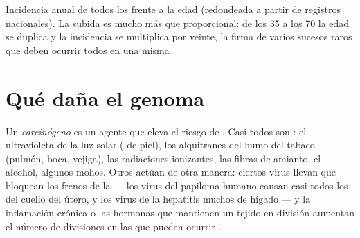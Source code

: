 \begin{omfigure}

{\small Incidencia anual de todos los  frente a la edad
(redondeada a partir de registros nacionales). La subida es mucho más
que proporcional: de los 35 a los 70 la edad se duplica y la incidencia
se multiplica por veinte, la firma de varios sucesos raros que deben
ocurrir todos en una misma .}
\end{omfigure}

\section{Qué daña el genoma}

\begin{definition}[Carcinógeno]\label{def:g11:cancer:carcinogen}
Un \emph{carcinógeno} es un agente que eleva el
riesgo de . Casi todos son : el ultravioleta de la luz
solar ( de piel), los alquitranes del humo del tabaco (pulmón,
boca, vejiga), las radiaciones ionizantes, las fibras de amianto, el
alcohol, algunos mohos. Otros actúan de otra manera: ciertos virus
llevan  que bloquean los frenos de la  --- los virus del
papiloma humano causan casi todos los  del cuello del útero, y
los virus de la hepatitis muchos  de hígado --- y la
inflamación crónica o las hormonas que mantienen un tejido en división
aumentan el número de divisiones en las que pueden ocurrir .
\end{definition}

